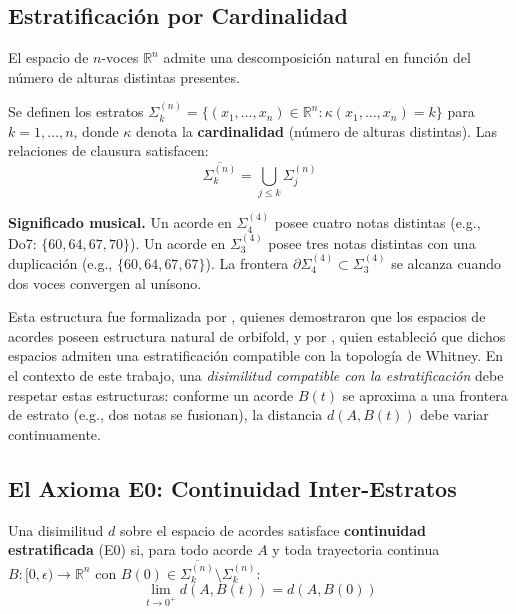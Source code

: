 \subsection{Estratificación por Cardinalidad}

El espacio de $n$-voces $\mathbb{R}^n$ admite una descomposición natural en función del número de alturas distintas presentes.

\begin{definition}
Se definen los estratos $\Sigma_k^{(n)} = \{ (x_1, \ldots, x_n) \in \mathbb{R}^n : \kappa(x_1, \ldots, x_n) = k \}$ para $k = 1, \ldots, n$, donde $\kappa$ denota la \textbf{cardinalidad} (número de alturas distintas). Las relaciones de clausura satisfacen:
\begin{equation}
\overline{\Sigma_k^{(n)}} = \bigcup_{j \leq k} \Sigma_j^{(n)}
\end{equation}
\end{definition}

\textbf{Significado musical.} Un acorde en $\Sigma_4^{(4)}$ posee cuatro notas distintas (e.g., Do7: $\{60, 64, 67, 70\}$). Un acorde en $\Sigma_3^{(4)}$ posee tres notas distintas con una duplicación (e.g., $\{60, 64, 67, 67\}$). La frontera $\partial\Sigma_4^{(4)} \subset \Sigma_3^{(4)}$ se alcanza cuando dos voces convergen al unísono.

Esta estructura fue formalizada por , quienes demostraron que los espacios de acordes poseen estructura natural de orbifold, y por , quien estableció que dichos espacios admiten una estratificación compatible con la topología de Whitney. En el contexto de este trabajo, una \textit{disimilitud compatible con la estratificación} debe respetar estas estructuras: conforme un acorde $B(t)$ se aproxima a una frontera de estrato (e.g., dos notas se fusionan), la distancia $d(A, B(t))$ debe variar continuamente.

\subsection{El Axioma E0: Continuidad Inter-Estratos}

\begin{definition}
\label{def:E0}
Una disimilitud $d$ sobre el espacio de acordes satisface \textbf{continuidad estratificada} (E0) si, para todo acorde $A$ y toda trayectoria continua $B: [0, \epsilon) \to \mathbb{R}^n$ con $B(0) \in \overline{\Sigma_k^{(n)}} \setminus \Sigma_k^{(n)}$:
\begin{equation}
\lim_{t \to 0^+} d(A, B(t)) = d(A, B(0))
\end{equation}
\end{definition}

